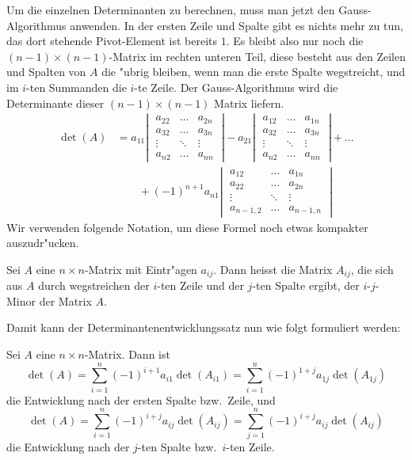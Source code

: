 Um die einzelnen Determinanten zu berechnen, muss man jetzt 
den Gauss-Algorithmus anwenden.
In der ersten Zeile und Spalte
gibt es nichts mehr zu tun, das dort stehende Pivot-Element ist
bereits $1$.
Es bleibt also nur noch die $(n-1)\times(n-1)$-Matrix
im rechten unteren Teil, diese besteht aus den Zeilen und Spalten
von $A$ die "ubrig bleiben, wenn man die erste Spalte wegstreicht,
und im $i$-ten Summanden die $i$-te Zeile.
Der Gauss-Algorithmus wird
die Determinante dieser $(n-1)\times(n-1)$ Matrix liefern.
\begin{align*}
\det(A)
&=
a_{11}
\left|\;
\begin{matrix}
a_{22}&\dots&a_{2n}\\
a_{32}&\dots&a_{3n}\\
\vdots&\ddots&\vdots\\
a_{n2}&\dots&a_{nn}
\end{matrix}
\;\right|
-a_{21}
\left|\;
\begin{matrix}
a_{12}&\dots&a_{1n}\\
a_{32}&\dots&a_{3n}\\
\vdots&\ddots&\vdots\\
a_{n2}&\dots&a_{nn}
\end{matrix}
\;\right|
+\dots
\\
&\qquad
+(-1)^{n+1}a_{n1}
\left|\;
\begin{matrix}
a_{12}&\dots&a_{1n}\\
a_{22}&\dots&a_{2n}\\
\vdots&\ddots&\vdots\\
a_{n-1,2}&\dots&a_{n-1,n}
\end{matrix}
\;\right|
\end{align*}
Wir verwenden folgende Notation, um diese Formel noch etwas kompakter
auszudr"ucken.
\begin{definition}Sei $A$ eine $n\times n$-Matrix mit Eintr"agen $a_{ij}$.
Dann heisst die Matrix $A_{ij}$, die sich aus $A$ durch wegstreichen
der $i$-ten Zeile und der $j$-ten Spalte ergibt, der $i$-$j$-Minor der
Matrix $A$.
\end{definition}
Damit kann der Determinantenentwicklungssatz nun wie folgt formuliert
werden:
\begin{satz}
Sei $A$ eine $n\times n$-Matrix.
Dann ist
\[
\det(A)=
\sum_{i=1}^n(-1)^{i+1}a_{i1}\det(A_{i1})
=
\sum_{i=1}^n(-1)^{1+j}a_{1j}\det(A_{1j})
\]
die Entwicklung nach der ersten Spalte bzw.~Zeile, und 
\[
\det(A)=
\sum_{i=1}^n(-1)^{i+j}a_{ij}\det(A_{ij})
=
\sum_{j=1}^n(-1)^{i+j}a_{ij}\det(A_{ij})
\]
die Entwicklung nach der $j$-ten Spalte bzw.~$i$-ten Zeile. 
\end{satz}

